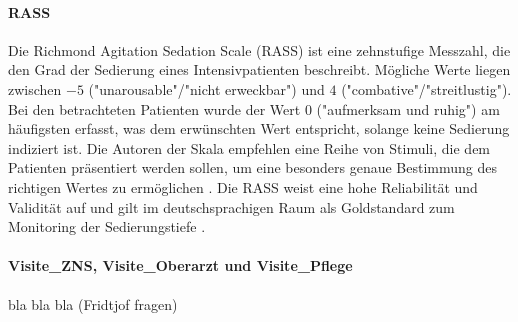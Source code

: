 \paragraph{RASS}
Die Richmond Agitation Sedation Scale (RASS) ist eine zehnstufige Messzahl, die den Grad der Sedierung eines Intensivpatienten beschreibt. Mögliche Werte liegen zwischen $-5$ ("unarousable"/"nicht erweckbar") und $4$ ("combative"/"streitlustig"). Bei den betrachteten Patienten wurde der Wert $0$ ("aufmerksam und ruhig") am häufigsten erfasst, was dem erwünschten Wert entspricht, solange keine Sedierung indiziert ist. Die Autoren der Skala empfehlen eine Reihe von Stimuli, die dem Patienten präsentiert werden sollen, um eine besonders genaue Bestimmung des richtigen Wertes zu ermöglichen \citep{sesslerRichmondAgitationSedation2002a}. Die RASS weist eine hohe Reliabilität und Validität auf und gilt im deutschsprachigen Raum als Goldstandard zum Monitoring der Sedierungstiefe \citep{marxIntensivmedizin2015c, muellerAnalgesieSedierungUnd2015}.



\paragraph{Visite\_ZNS, Visite\_Oberarzt und Visite\_Pflege}
bla bla bla (Fridtjof fragen)

